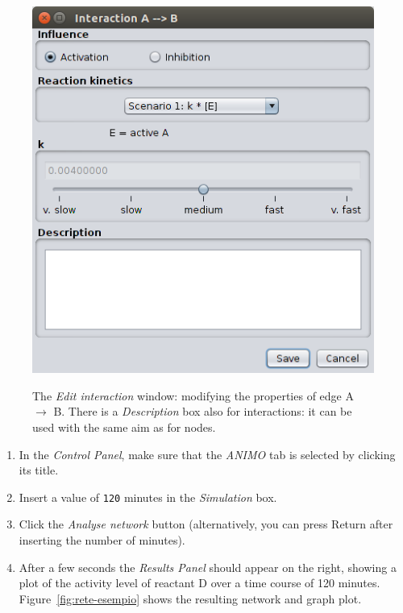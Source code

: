 \documentclass{article}
\begin{document}
\begin{figure}[!tpb]
\begin{minipage}{\textwidth}
\begin{center}
\includegraphics[width=.45\textwidth]{images/edit_reactionAB_new}\\
\caption{The \emph{Edit interaction} window: modifying the properties of edge A $\rightarrow$ B. There is a
\emph{Description} box also for interactions: it can be used with the same aim as for nodes.}\label{fig:edit-reaction}
\end{center}
\end{minipage}
\end{figure}

\begin{enumerate}
\setcounter{enumi}{\value{miocounterperenumerate}}
\item In the \emph{Control Panel}, make sure that the \emph{ANIMO} tab is selected by clicking its title.
\item Insert a value of {\tt 120} minutes in the \emph{Simulation} box.
\item Click the \emph{Analyse network} button (alternatively, you can press Return after inserting the number of minutes).
\item After a few seconds the \emph{Results Panel} should appear on the right,
showing a plot of the activity level of reactant D over a time course of 120 minutes.
Figure~\ref{fig:rete-esempio} shows the resulting network and graph plot.
\end{enumerate}
\end{document}
